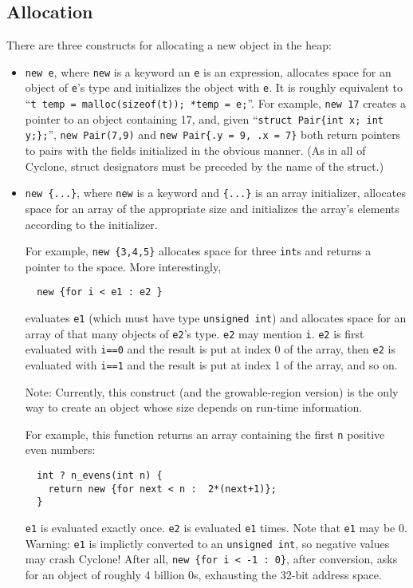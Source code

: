 \subsection{Allocation}
There are three constructs for allocating a new object in the heap:
\begin{itemize}
\item \texttt{new e}, where \texttt{new} is a keyword an \texttt{e} is an
  expression, allocates space for an object of \texttt{e}'s type and
  initializes the object with \texttt{e}.  It is roughly equivalent to
  ``\texttt{t temp = malloc(sizeof(t)); *temp = e;}''.  For example,
  \texttt{new 17} creates a pointer to an object containing 17, and,
  given ``\verb|struct Pair{int x; int y;};|'', \texttt{new Pair(7,9)}
  and \verb|new Pair{.y = 9, .x = 7}| both return pointers to pairs
  with the fields initialized in the obvious manner.  (As in all of
  Cyclone, struct designators must be preceded by the name of the struct.)

\item \verb|new {...}|, where \texttt{new} is a keyword and \verb|{...}|
  is an array initializer, allocates space for an array of the
  appropriate size and initializes the array's elements according to
  the initializer.
  
  For example, \verb|new {3,4,5}| allocates space for three
  \texttt{int}s and returns a pointer to the space.  More interestingly,
\begin{verbatim}
  new {for i < e1 : e2 }
\end{verbatim}
  evaluates \texttt{e1} (which must have type \texttt{unsigned int}) and
  allocates space for an array of that many objects of \texttt{e2}'s
  type.  \texttt{e2} may mention \texttt{i}.  \texttt{e2} is first evaluated
  with \texttt{i==0} and the result is put at index 0 of the array, then
  \texttt{e2} is evaluated with \texttt{i==1} and the result is put at
  index 1 of the array, and so on.
  
  Note: Currently, this construct (and the growable-region version) is
  the only way to create an object whose size depends on run-time
  information.
  
  For example, this function returns an array containing the first \texttt{n}
  positive even numbers:
\begin{verbatim}
  int ? n_evens(int n) {
    return new {for next < n :  2*(next+1)};
  }
\end{verbatim}
  \texttt{e1} is evaluated exactly once.  \texttt{e2} is evaluated
  \texttt{e1} times.  Note that \texttt{e1} may be 0.  Warning: \texttt{e1}
  is implictly converted to an \texttt{unsigned int}, so negative values
  may crash Cyclone!  After all, \verb|new {for i < -1 : 0}|, after
  conversion, asks for an object of roughly 4 billion 0s, exhausting
  the 32-bit address space.
  

\end{itemize}

